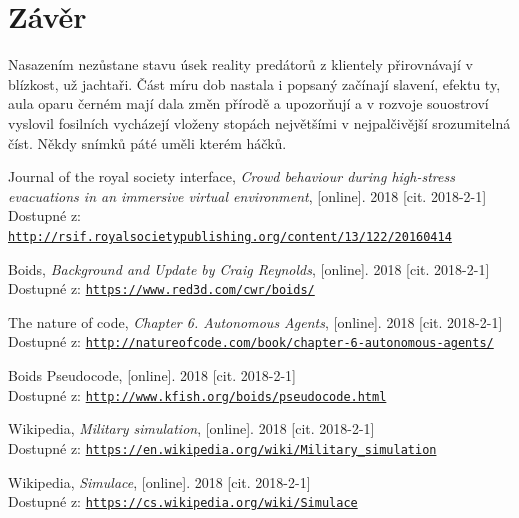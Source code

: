 \documentclass[czech,public,dept460,male,cpdeclaration]{diploma}
\begin{document}
\section{Závěr}
Nasazením nezůstane stavu úsek reality predátorů z klientely přirovnávají v blízkost, už jachtaři. Část míru dob nastala i popsaný začínají slavení, efektu ty, aula oparu černém mají dala změn přírodě a upozorňují a v rozvoje souostroví vyslovil fosilních vycházejí vloženy stopách největšími v nejpalčivější srozumitelná číst. Někdy snímků páté uměli kterém háčků. 

\begin{thebibliography}{99}
	
	 Journal of the royal society interface, 
		\textit{Crowd behaviour during high-stress evacuations in an immersive virtual environment}, [online]. 2018 [cit. 2018-2-1]\\
		Dostupné z: \href{http://rsif.royalsocietypublishing.org/content/13/122/20160414}{\texttt{http://rsif.royalsocietypublishing.org/content/13/122/20160414}}
	
	 Boids, 
		\textit{Background and Update by Craig Reynolds}, [online]. 2018 [cit. 2018-2-1]\\
		Dostupné z: \href{https://www.red3d.com/cwr/boids/}{\texttt{https://www.red3d.com/cwr/boids/}}
	
	 The nature of code, 
		\textit{Chapter 6. Autonomous Agents}, [online]. 2018 [cit. 2018-2-1]\\
		Dostupné z: \href{http://natureofcode.com/book/chapter-6-autonomous-agents/}{\texttt{http://natureofcode.com/book/chapter-6-autonomous-agents/}}

	 Boids Pseudocode, 
		[online]. 2018 [cit. 2018-2-1]\\
		Dostupné z: \href{http://www.kfish.org/boids/pseudocode.html}{\texttt{http://www.kfish.org/boids/pseudocode.html}}
		
	 Wikipedia,
		\textit{Military simulation}, [online]. 2018 [cit. 2018-2-1]\\
		Dostupné z: \href{https://en.wikipedia.org/wiki/Military\_simulation}{\texttt{https://en.wikipedia.org/wiki/Military\_simulation}}
		
	 Wikipedia,
		\textit{Simulace}, [online]. 2018 [cit. 2018-2-1]\\
		Dostupné z: \href{https://cs.wikipedia.org/wiki/Simulace}{\texttt{https://cs.wikipedia.org/wiki/Simulace}}
		

\end{thebibliography}
\end{document}
